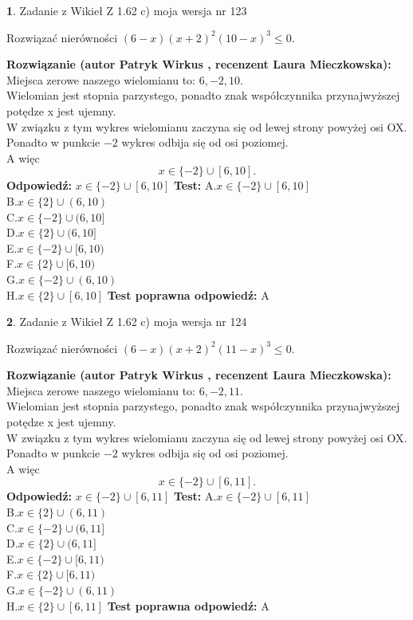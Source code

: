 \documentclass[12pt, a4paper]{article}
\theoremstyle{definition} %
\newtheorem{zad}{}
\newcommand{\zadStart}[1]{\begin{zad}#1\newline}
\newcommand{\zadStop}{\end{zad}}
\newcommand{\rozwStart}[2]{\noindent \textbf{Rozwiązanie (autor #1 , recenzent #2): }\newline}
\newcommand{\rozwStop}{\newline}
\newcommand{\odpStart}{\noindent \textbf{Odpowiedź:}\newline}
\newcommand{\odpStop}{\newline}
\newcommand{\testStart}{\noindent \textbf{Test:}\newline}
\newcommand{\testStop}{\newline}
\newcommand{\kluczStart}{\noindent \textbf{Test poprawna odpowiedź:}\newline}
\newcommand{\kluczStop}{\newline}
\begin{document}
\zadStart{Zadanie z Wikieł Z 1.62 c) moja wersja nr 123}

Rozwiązać nierówności $(6-x)(x+2)^{2}(10-x)^{3}\le0$.
\zadStop
\rozwStart{Patryk Wirkus}{Laura Mieczkowska}
Miejsca zerowe naszego wielomianu to: $6, -2, 10$.\\
Wielomian jest stopnia parzystego, ponadto znak współczynnika przy\linebreak najwyższej potędze x jest ujemny.\\ W związku z tym wykres wielomianu zaczyna się od lewej strony powyżej osi OX.\\
Ponadto w punkcie $-2$ wykres odbija się od osi poziomej.\\
A więc $$x \in \{-2\} \cup [6,10].$$
\rozwStop
\odpStart
$x \in \{-2\} \cup [6,10]$
\odpStop
\testStart
A.$x \in \{-2\} \cup [6,10]$\\
B.$x \in \{2\} \cup (6,10)$\\
C.$x \in \{-2\} \cup (6,10]$\\
D.$x \in \{2\} \cup (6,10]$\\
E.$x \in \{-2\} \cup [6,10)$\\
F.$x \in \{2\} \cup [6,10)$\\
G.$x \in \{-2\} \cup (6,10)$\\
H.$x \in \{2\} \cup [6,10]$
\testStop
\kluczStart
A
\kluczStop



\zadStart{Zadanie z Wikieł Z 1.62 c) moja wersja nr 124}

Rozwiązać nierówności $(6-x)(x+2)^{2}(11-x)^{3}\le0$.
\zadStop
\rozwStart{Patryk Wirkus}{Laura Mieczkowska}
Miejsca zerowe naszego wielomianu to: $6, -2, 11$.\\
Wielomian jest stopnia parzystego, ponadto znak współczynnika przy\linebreak najwyższej potędze x jest ujemny.\\ W związku z tym wykres wielomianu zaczyna się od lewej strony powyżej osi OX.\\
Ponadto w punkcie $-2$ wykres odbija się od osi poziomej.\\
A więc $$x \in \{-2\} \cup [6,11].$$
\rozwStop
\odpStart
$x \in \{-2\} \cup [6,11]$
\odpStop
\testStart
A.$x \in \{-2\} \cup [6,11]$\\
B.$x \in \{2\} \cup (6,11)$\\
C.$x \in \{-2\} \cup (6,11]$\\
D.$x \in \{2\} \cup (6,11]$\\
E.$x \in \{-2\} \cup [6,11)$\\
F.$x \in \{2\} \cup [6,11)$\\
G.$x \in \{-2\} \cup (6,11)$\\
H.$x \in \{2\} \cup [6,11]$
\testStop
\kluczStart
A
\kluczStop
\end{document}
